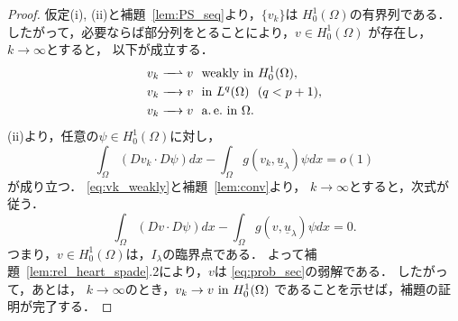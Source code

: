 \begin{proof}
 仮定(i), (ii)と補題~\ref{lem:PS_seq}より，$\{v_k \}$は
 $H_0^1(\Omega)$の有界列である．
 したがって，必要ならば部分列をとることにより，$v \in H_0^1(\Omega)$
 が存在し，$k \to \infty$とすると，
 以下が成立する．
 \begin{align}
  v_k \xrightharpoonup{ \mbox{ ~ } } v & \ \ \text{weakly~} \tin
  H_0^1(\Omega), \label{eq:vk_weakly} \\
  v_k \xrightarrow{ \mbox{ ~ } } v & \ \ \tin L^q(\Omega) \ \
   (q < p+1), \label{eq:vk_Lq} \\
  v_k \xrightarrow{ \mbox{ ~ } } v & \ \ \ae \tin \Omega. 
    \label{eq:vk_ae}
 \end{align}
 (ii)より，任意の$\psi \in H_0^1(\Omega)$に対し，
 \[
 \int_\Omega (Dv_k \cdot D\psi) dx - \int_\Omega g(v_k,
 \underline{u}_\lambda) \psi dx = o(1)
 \]
 が成り立つ．
 \eqref{eq:vk_weakly}と補題~\ref{lem:conv}より，
 $k \to \infty$とすると，次式が従う．
 \begin{equation}
  \int_\Omega (Dv \cdot D\psi) dx - \int_\Omega g(v,
   \underline{u}_\lambda) \psi dx = 0. \label{eq:intvpsi}
 \end{equation}
 つまり，$v \in H_0^1(\Omega)$は，$I_\lambda$の臨界点である．
 よって補題~\ref{lem:rel_heart_spade}.2により，$v$は
 \ref{eq:prob_sec}の弱解である．
 したがって，あとは，
 $k \to \infty$のとき，$v_k \to v ~\text{in}~ H_0^1(\Omega)$
 であることを示せば，補題の証明が完了する．


\end{proof}
